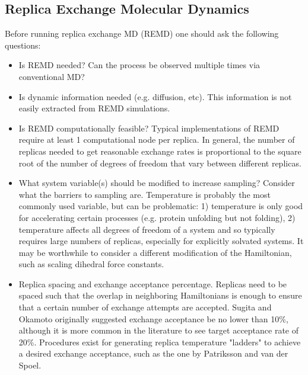 \subsection{Replica Exchange Molecular Dynamics}
Before running replica exchange MD (REMD)\citep{Sugita1999} one should ask the following questions:
\begin{itemize}
  \item Is REMD needed? Can the process be observed multiple times via conventional MD?
  \item Is dynamic information needed (e.g. diffusion, etc). This information is not easily extracted from REMD simulations.
  \item Is REMD computationally feasible? Typical implementations of REMD require at least 1 computational node per replica. In general, the number of replicas needed to get reasonable exchange rates is proportional to the square root of the number of degrees of freedom that vary between different replicas.
  \item What system variable(s) should be modified to increase sampling? Consider what the barriers to sampling are. Temperature is probably the most commonly used variable, but can be problematic: 1) temperature is only good for accelerating certain processes (e.g. protein unfolding but not folding), 2) temperature affects all degrees of freedom of a system and so typically requires large numbers of replicas, especially for explicitly solvated systems. It may be worthwhile to consider a different modification of the Hamiltonian, such as scaling dihedral force constants.
  \item Replica spacing and exchange acceptance percentage. Replicas need to be spaced such that the overlap in neighboring Hamiltonians is enough to ensure that a certain number of exchange attempts are accepted. Sugita and Okamoto\citep{Sugita1999} originally suggested exchange acceptance be no lower than 10\%, although it is more common in the literature to see target acceptance rate of 20\%. Procedures exist for generating replica temperature "ladders" to achieve a desired exchange acceptance, such as the one by Patriksson and van der Spoel.\citep{Patriksson2008}
\end{itemize}


